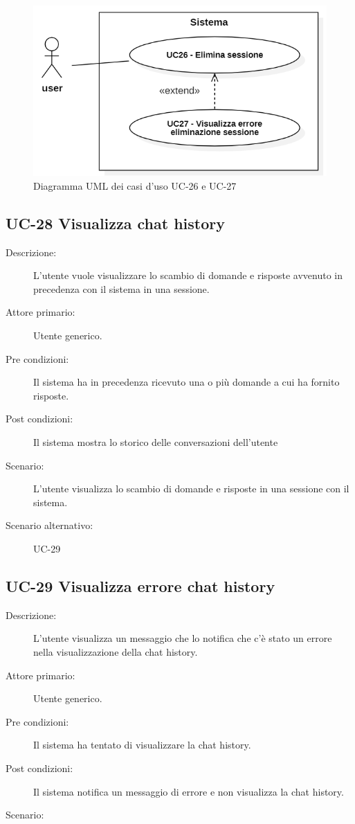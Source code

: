 \begin{figure}[H]
    \centering
    \includegraphics[width=0.9\linewidth]{UC26-27.PNG}
    \caption{Diagramma UML dei casi d'uso UC-26 e UC-27}
    \label{fig:UC26-27}
\end{figure}

\subsection{UC-28 Visualizza chat history}
\begin{description}
    \item[Descrizione:] L'utente vuole visualizzare lo scambio di domande e risposte avvenuto in precedenza con il sistema in una sessione.
    \item[Attore primario:] Utente generico.
    \item[Pre condizioni:] Il sistema ha in precedenza ricevuto una o più domande a cui ha fornito risposte.
    \item[Post condizioni:] Il sistema mostra lo storico delle conversazioni dell'utente
    \item[Scenario:] L'utente visualizza lo scambio di domande e risposte in una sessione con il sistema.
    \item[Scenario alternativo:] UC-29
\end{description} 

\subsection{UC-29 Visualizza errore chat history }
\begin{description}
    \item[Descrizione:] L'utente visualizza un messaggio che lo notifica che c'è stato un errore nella visualizzazione della chat history.
    \item[Attore primario:] Utente generico.
    \item[Pre condizioni:] Il sistema ha tentato di visualizzare la chat history.
    \item[Post condizioni:] Il sistema notifica un messaggio di errore e non visualizza la chat history.
    \item[Scenario:] 
\end{description}

